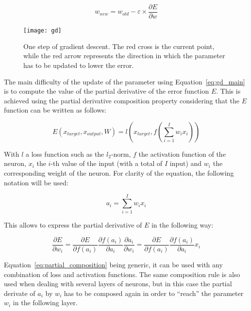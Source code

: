 \begin{equation}
    w_{new} = w_{old} - \varepsilon \times \frac{\partial E}{\partial w}
    \label{eq:gd_main}
\end{equation}

    \begin{figure}[h]
        \centering
        \texttt{[image: gd]}
        \caption{One step of gradient descent. The red cross is the current point, while the red arrow represents the direction in which the parameter has to be updated to lower the error.}
\label{fig:gd}
    \end{figure}

    The main difficulty of the update of the parameter using Equation~\ref{eq:gd_main} is to compute the value of the partial derivative of the error function $E$. This is achieved using the partial derivative composition property considering that the $E$ function can be written as follows:

    \begin{equation}
        E\left(x_{target}, x_{output}, W\right) = l\left(x_{target}, f\left(\sum_{i=1}^I w_i x_i\right)\right)
        \label{eq:error_function}
    \end{equation}

    With $l$ a loss function such as the $l_2$-norm, $f$ the activation function of the neuron, $x_i$ the $i$-th value of the input (with a total of $I$ input) and $w_i$ the corresponding weight of the neuron. For clarity of the equation, the following notation will be used:

    \begin{equation}
        a_i = \sum_{i=1}^I w_i x_i
        \label{eq:weighted_sum}
    \end{equation}

    This allows to express the partial derivative of $E$ in the following way:

    \begin{equation}
        \frac{\partial E}{\partial w_i} = \frac{\partial E}{\partial f\left( a_i\right)} \frac{\partial f(a_i)}{\partial a_i}\frac{\partial a_i}{\partial w_i} = \frac{\partial E}{\partial f\left( a_i\right)} \frac{\partial f(a_i)}{\partial a_i} x_i
        \label{eq:partial_composition}
    \end{equation}

    Equation~\ref{eq:partial_composition} being generic, it can be used with any combination of loss and activation functions. The same composition rule is also used when dealing with several layers of neurons, but in this case the partial derivate of $a_i$ by $w_i$ has to be composed again in order to ``reach'' the parameter $w_i$ in the following layer.\\

